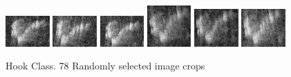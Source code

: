 \begin{figure}
    \includegraphics[width=0.15\textwidth]{chapters/images/dataset/all-class-images/hook/hook-106.jpg}
    \includegraphics[width=0.15\textwidth]{chapters/images/dataset/all-class-images/hook/hook-127.jpg}
    \includegraphics[width=0.15\textwidth]{chapters/images/dataset/all-class-images/hook/hook-107.jpg}
    \includegraphics[width=0.15\textwidth]{chapters/images/dataset/all-class-images/hook/hook-63.jpg}
    \includegraphics[width=0.15\textwidth]{chapters/images/dataset/all-class-images/hook/hook-86.jpg}
    \includegraphics[width=0.15\textwidth]{chapters/images/dataset/all-class-images/hook/hook-100.jpg}
    
    \caption{Hook Class. 78 Randomly selected image crops}
    \label{appendix:hook}
\end{figure}

